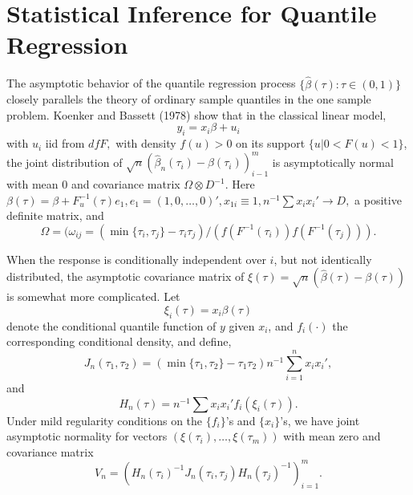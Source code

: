 \documentclass{amsart}
\begin{document}
\section{Statistical Inference for Quantile Regression}

The asymptotic behavior of the quantile regression process $\{\hat\beta (\tau):
\tau \in (0, 1)\}$ closely parallels the theory of ordinary sample
quantiles in the one sample problem.  Koenker and Bassett (1978)
show that in the classical linear model,
$$
y_i = x_i\beta + u_i
$$
with $u_i$ iid from $df F,$ with density $f(u) > 0$ on its support
$\{u| 0<F(u) < 1\}$, the joint distribution of
$\sqrt n(\hat\beta_n(\tau_i) - \beta(\tau_i))_{i-1}^m$ is asymptotically normal
with mean 0 and covariance matrix $\Omega \otimes D^{-1}$.
Here $\beta(\tau) = \beta + F_u^{-1}(\tau) e_1, e_1 = (1, 0, \ldots, 0)', x_{1i}
\equiv 1, n^{-1} \sum x_ix_i' \rightarrow D, $ a positive definite matrix, and
\[
\Omega = (\omega_{ij} = (\min\{ \tau_i , \tau_j\}  -\tau_i\tau_j)/(f(F^{-1}(\tau_i))
f(F^{-1}(\tau_j))).
\]

When the response is conditionally independent over $i$, but not identically
distributed, the asymptotic covariance matrix of
$\xi(\tau) = \sqrt n(\hat\beta(\tau) - \beta(\tau))$ is somewhat more
complicated.  Let
$$
\xi_i(\tau) = x_i\beta(\tau)
$$
denote the conditional quantile function of $y$ given $x_i$, and $f_i(\cdot)$
the corresponding conditional density, and define,
\[
J_n(\tau_1, \tau_2) =
( \min \{ \tau_1 , \tau_2\} - \tau_1\tau_2)n^{-1}\sum_{i=1}^n x_ix_i',
\]
and
\[
H_n(\tau) = n^{-1} \sum x_ix_i'f_i(\xi_i(\tau)).
\]
Under mild regularity conditions on the $\{f_i\}$'s and $\{x_i\}$'s,
we have joint asymptotic normality for vectors
$( \xi(\tau_i), \ldots, \xi(\tau_m))$
with mean zero and covariance matrix
$$
V_n = (H_n(\tau_i)^{-1} J_n (\tau_i, \tau_j)H_n(\tau_j)^{-1})_{i=1}^m .
$$
\end{document}
